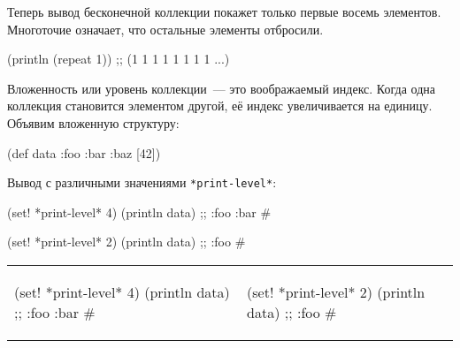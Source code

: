 Теперь вывод бесконечной коллекции покажет только первые восемь
элементов. Многоточие означает, что остальные элементы отбросили.

\begin{english}
  \begin{clojure}
(println (repeat 1))
;; (1 1 1 1 1 1 1 1 ...)
  \end{clojure}
\end{english}

Вложенность или уровень коллекции~--- это воображаемый индекс. Когда одна коллекция
становится элементом другой, её индекс увеличивается на единицу. Объявим
вложенную структуру:

\begin{english}
  \begin{clojure}
(def data {:foo
            {:bar
              {:baz [42]}}})
  \end{clojure}
\end{english}

Вывод с различными значениями \texttt{*print\--le\-vel*}:

\ifnarrow

\begin{english}
  \begin{clojure}
(set! *print-level* 4)
(println data)
;; {:foo {:bar #}}
  \end{clojure}

\splitter

  \begin{clojure}
(set! *print-level* 2)
(println data)
;; {:foo #}
  \end{clojure}
\end{english}

\else

\begin{english}
\noindent
\begin{tabular}{ @{}p{5cm} @{}p{5cm} }


  \begin{clojure}
(set! *print-level* 4)
(println data)
;; {:foo {:bar #}}
  \end{clojure}

&

  \begin{clojure}
(set! *print-level* 2)
(println data)
;; {:foo #}
  \end{clojure}

\end{tabular}

\end{english}

